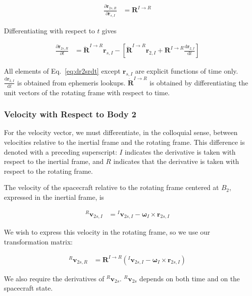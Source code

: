\documentclass[]{article}
\newcommand{\vb}[1]{\bm{#1}} %
\newcommand{\vbd}[1]{\dot{\bm{#1}}} %
\newcommand{\ddt}[1]{\frac{\mathrm{d} #1}{\mathrm{d} t}} %
\newcommand{\pd}[2]{\frac{\partial #1}{\partial #2}} %
\newcommand{\vbr}[0]{\vb{r}}
\newcommand{\vbv}[0]{\vb{v}}
\begin{document}
\begin{align}
	\pd{\vb{r}_{2s, R}}{\vbr_{s,I}} &= \vb{R}^{I \rightarrow R}
\end{align}

\noindent Differentiating with respect to $t$ gives

\begin{align}
	\label{eq:dr2srdt}
	\pd{\vb{r}_{2s, R}}{t} &= \vbd{R}^{I \rightarrow R} \vbr_{s,I} - \left[ \vbd{R}^{I \rightarrow R} \vbr_{2,I} + \vb{R}^{I \rightarrow R} \ddt{\vbr_{2,I}} \right]
\end{align}

\noindent All elements of Eq.~\eqref{eq:dr2srdt} except $\vbr_{s,I}$ are explicit functions of time only. $\ddt{\vbr_{2,I}}$ is obtained from ephemeris lookups. $\vbd{R}^{I \rightarrow R}$ is obtained by differentiating the unit vectors of the rotating frame with respect to time.

\subsubsection{Velocity with Respect to Body 2}
\label{sec:velocity_wrt_body2}

For the velocity vector, we must differentiate, in the colloquial sense, between velocities relative to the inertial frame and the rotating frame. This difference is denoted with a preceding superscript: $I$ indicates the derivative is taken with respect to the inertial frame, and $R$ indicates that the derivative is taken with respect to the rotating frame.

The velocity of the spacecraft relative to the rotating frame centered at $B_2$, expressed in the inertial frame, is

\begin{align}
	{}^R \vbv_{2s,I} &= {}^I \vbv_{2s,I} - \vb{\omega}_I \times \vbr_{2s,I}
\end{align}

\noindent We wish to express this velocity in the rotating frame, so we use our transformation matrix:

\begin{align}
{}^R \vbv_{2s,R} &= \vb{R}^{I \rightarrow R} \left( {}^I \vbv_{2s,I} - \vb{\omega}_I \times \vbr_{2s,I} \right)
\end{align}


We also require the derivatives of ${}^R \vb{v}_{2s}$. ${}^R \vb{v}_{2s}$ depends on both time and on the spacecraft state.
\end{document}
